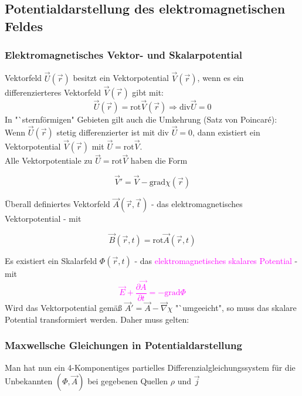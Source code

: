 \documentclass[]{article}
\begin{document}
\newpage

\subsection{Potentialdarstellung des elektromagnetischen Feldes}
\subsubsection{Elektromagnetisches Vektor- und Skalarpotential}
	Vektorfeld $\vec{U}(\vec{r})$ besitzt ein Vektorpotential $\vec{V}(\vec{r})$, wenn es ein differenzierteres Vektorfeld $\vec{V}(\vec{r})$ gibt mit: 
	$$\vec{U}(\vec{r})= \text{rot} \vec{V}(\vec{r}) \Rightarrow\text{div}\vec{U}=0$$
	In "`sternförmigen" Gebieten gilt auch die Umkehrung (Satz von Poincaré):
	\\Wenn $\vec{U}(\vec{r})$ stetig differenzierter ist mit div $\vec{U}=0$, dann existiert ein Vektorpotential $\vec{V}(\vec{r})$  mit $\vec{U}= \text{rot}\vec{V}$.
	\\Alle Vektorpotentiale zu $\vec{U}= \text{rot}\vec{V}$ haben die Form 
	\\
	
	\begin{boxedminipage}[cyan]{\textwidth}
		$$\vec{V}'=\vec{V}-\text{grad}\chi(\vec{r})$$ 
	\end{boxedminipage}

	Überall definiertes Vektorfeld $\vec{A}(\vec{r},\vec{t})$ - das elektromagnetisches Vektorpotential - mit 
	\\
	\begin{boxedminipage}[magenta]{\textwidth}
		$$\vec{B}(\vec{r},t)=\text{rot}\vec{A}(\vec{r},t)$$
	\end{boxedminipage}
	
	Es existiert ein Skalarfeld $\Phi (\vec{r},t)$ - das \textcolor{magenta}{elektromagnetisches skalares Potential} - mit \textcolor{magenta}{$$\vec{E}+\frac{\partial \vec{A}}{\partial t}=-\text{grad}\Phi$$}
	Wird das Vektorpotential gemäß $\vec{A}'=\vec{A}-\vec{\nabla}\chi$ "`umgeeicht", so muss das skalare Potential transformiert werden. Daher muss gelten: \textcolor{blue}{}

\subsubsection{Maxwellsche Gleichungen in Potentialdarstellung}
	Man hat nun ein 4-Komponentiges partielles Differenzialgleichungssystem für die Unbekannten $(\Phi, \vec{A})$ bei gegebenen Quellen $\rho$ und $\vec{j}$
	
\end{document}
